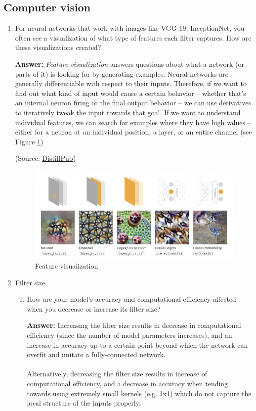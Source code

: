 \documentclass{article}
\newenvironment{QandA}{\begin{enumerate}[label=\arabic*.]}{\end{enumerate}}
\newenvironment{InnerQandA}{\begin{enumerate}[label=\roman*.]}{\end{enumerate}}
\newenvironment{answer}{\par\normalfont \textbf{Answer:}}{}
\begin{document}
\subsection{Computer vision}
\begin{QandA}
    \item For neural networks that work with images like VGG-19, InceptionNet, you often see a visualization of what type of features each filter captures. How are these visualizations created?
    \begin{answer}
        \textit{Feature visualization} answers questions about what a network (or parts of it) is looking for by generating examples. Neural networks are generally differentiable with respect to their inputs. Therefore, if we want to find out what kind of input would cause a certain behavior -- whether that's an internal neuron firing or the final output behavior -- we can use derivatives to iteratively tweak the input towards that goal. If we want to understand individual features, we can search for examples where they have high values -- either for a neuron at an individual position, a layer, or an entire channel (see Figure \ref{fig:feature-visualization})

        (Source: \href{https://distill.pub/2017/feature-visualization/}{DistillPub})
    \end{answer}
    \begin{figure}[h!]
        \centering
        \includegraphics[width=0.7\columnwidth]{img/feature-visualization.png}
        \caption{Feature visualization}
        \label{fig:feature-visualization}
    \end{figure}

    \item Filter size
    \begin{InnerQandA}
        \item How are your model’s accuracy and computational efficiency affected when you decrease or increase its filter size?
        \begin{answer}
            Increasing the filter size results in decrease in computational efficiency (since the number of model parameters increases), and an increase in accuracy up to a certain point beyond which the network can overfit and imitate a fully-connected network. \\\\
            Alternatively, decreasing the filter size results in increase of computational efficiency, and a decrease in accuracy when tending towards using extremely small kernels (e.g. 1x1) which do not capture the local structure of the inputs properly.
        \end{answer}


\end{InnerQandA}
\end{QandA}
\end{document}
